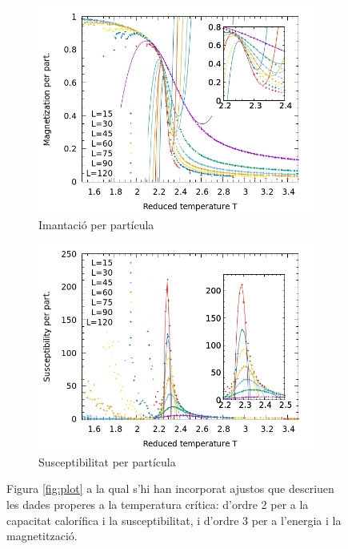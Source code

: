 \documentclass[a4paper]{article}
\begin{document}
\begin{figure}[H]
\begin{subfigure}{.45\textwidth}
        \includegraphics[width=\textwidth]{plot-m-fit.png}
        \caption{Imantació per partícula}
        \label{fig:fit-m}
    \end{subfigure}
    \begin{subfigure}{.45\textwidth}
        \centering
        \includegraphics[width=\textwidth]{plot-x-fit.png}
        \caption{Susceptibilitat per partícula}
        \label{fig:fit-x}
    \end{subfigure}
    \caption{Figura \ref{fig:plot} a la qual s'hi han incorporat ajustos que descriuen les dades properes a la temperatura crítica: d'ordre 2 per a la capacitat calorífica i la susceptibilitat, i d'ordre 3 per a l'energia i la magnetització.}
\label{fig:fit}
\end{figure}
\end{document}
